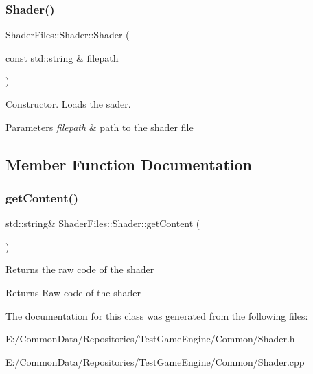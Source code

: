 \subsubsection{\texorpdfstring{Shader()}{Shader()}}
{\footnotesize\ttfamily Shader\+Files\+::\+Shader\+::\+Shader (\begin{DoxyParamCaption}\item[{const std\+::string \&}]{filepath }\end{DoxyParamCaption})}

Constructor. Loads the sader. 
\begin{DoxyParams}{Parameters}
{\em filepath} & path to the shader file \\
\hline
\end{DoxyParams}


\subsection{Member Function Documentation}
\mbox{\label{class_shader_files_1_1_shader_aa62cf96b80a461f38e81313699434279}} 
\subsubsection{\texorpdfstring{getContent()}{getContent()}}
{\footnotesize\ttfamily std\+::string\& Shader\+Files\+::\+Shader\+::get\+Content (\begin{DoxyParamCaption}{ }\end{DoxyParamCaption})\hspace{0.3cm}{\ttfamily [inline]}}

Returns the raw code of the shader \begin{DoxyReturn}{Returns}
Raw code of the shader 
\end{DoxyReturn}


The documentation for this class was generated from the following files\+:\begin{DoxyCompactItemize}
\item 
E\+:/\+Common\+Data/\+Repositories/\+Test\+Game\+Engine/\+Common/Shader.\+h\item 
E\+:/\+Common\+Data/\+Repositories/\+Test\+Game\+Engine/\+Common/Shader.\+cpp\end{DoxyCompactItemize}
